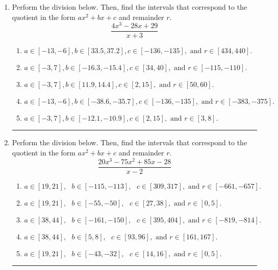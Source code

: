 \documentclass[14pt]{extbook}
\newcommand{\litem}[1]{\item#1\hspace*{-1cm}\rule{\textwidth}{0.4pt}}
\begin{document}
\begin{enumerate}
{\begin{enumerate}[label=\Alph*.]
\end{enumerate} }
\litem{
Perform the division below. Then, find the intervals that correspond to the quotient in the form $ax^2+bx+c$ and remainder $r$.\[ \frac{4x^{3} -28 x + 29}{x + 3} \]\begin{enumerate}[label=\Alph*.]
\item \( a \in [-13, -6], b \in [33.5, 37.2], c \in [-136, -135], \text{ and } r \in [434, 440]. \)
\item \( a \in [-3, 7], b \in [-16.3, -15.4], c \in [34, 40], \text{ and } r \in [-115, -110]. \)
\item \( a \in [-3, 7], b \in [11.9, 14.4], c \in [2, 15], \text{ and } r \in [50, 60]. \)
\item \( a \in [-13, -6], b \in [-38.6, -35.7], c \in [-136, -135], \text{ and } r \in [-383, -375]. \)
\item \( a \in [-3, 7], b \in [-12.1, -10.9], c \in [2, 15], \text{ and } r \in [3, 8]. \)

\end{enumerate} }
\litem{
Perform the division below. Then, find the intervals that correspond to the quotient in the form $ax^2+bx+c$ and remainder $r$.\[ \frac{20x^{3} -75 x^{2} +85 x -28}{x -2} \]\begin{enumerate}[label=\Alph*.]
\item \( a \in [19, 21], \text{   } b \in [-115, -113], \text{   } c \in [309, 317], \text{   and   } r \in [-661, -657]. \)
\item \( a \in [19, 21], \text{   } b \in [-55, -50], \text{   } c \in [27, 38], \text{   and   } r \in [0, 5]. \)
\item \( a \in [38, 44], \text{   } b \in [-161, -150], \text{   } c \in [395, 404], \text{   and   } r \in [-819, -814]. \)
\item \( a \in [38, 44], \text{   } b \in [5, 8], \text{   } c \in [93, 96], \text{   and   } r \in [161, 167]. \)
\item \( a \in [19, 21], \text{   } b \in [-43, -32], \text{   } c \in [14, 16], \text{   and   } r \in [0, 5]. \)


\end{enumerate}}
\end{enumerate}
\end{document}
